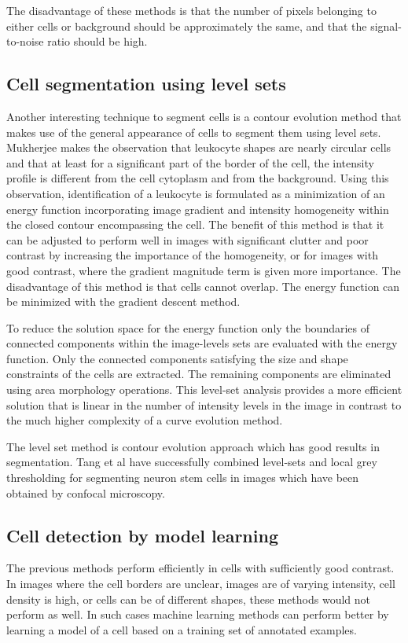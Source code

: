 The disadvantage of these methods is that the number of pixels belonging to either cells or background should be approximately the same, and that the signal-to-noise ratio should be high.

\subsection{Cell segmentation using level sets}

Another interesting technique to segment cells is a contour evolution method that makes use of the general appearance of cells to segment them using level sets. Mukherjee \cite{mukherjee04} makes the observation that leukocyte shapes are nearly circular cells and that at least for a significant part of the border of the cell, the intensity profile is different from the cell cytoplasm and from the background. Using this observation, identification of a leukocyte is formulated as a minimization of an energy function incorporating image gradient and intensity homogeneity within the closed contour encompassing the cell. The benefit of this method is that it can be adjusted to perform well in images with significant clutter and poor contrast by increasing the importance of the homogeneity, or for images with good contrast, where the gradient magnitude term is given more importance. The disadvantage of this method is that cells cannot overlap. The energy function can be minimized with the gradient descent method.

To reduce the solution space for the energy function only the boundaries of connected components within the image-levels sets are evaluated with the energy function. Only the connected components satisfying the size and shape constraints of the cells are extracted. The remaining components are eliminated using area morphology operations. This level-set analysis provides a more efficient solution that is linear in the number of intensity levels in the image in contrast to the much higher complexity of a curve evolution method.

The level set method is contour evolution approach which has good results in segmentation. Tang et al \cite{tang} have successfully combined level-sets and local grey thresholding \cite{xu10} for segmenting neuron stem cells in images which have been obtained by confocal microscopy.

\subsection{Cell detection by model learning}
The previous methods perform efficiently in cells with sufficiently good contrast. In images where the cell borders are unclear, images are of varying intensity, cell density is high, or cells can be of different shapes, these methods would not perform as well. In such cases machine learning methods can perform better by learning a model of a cell based on a training set of annotated examples.

